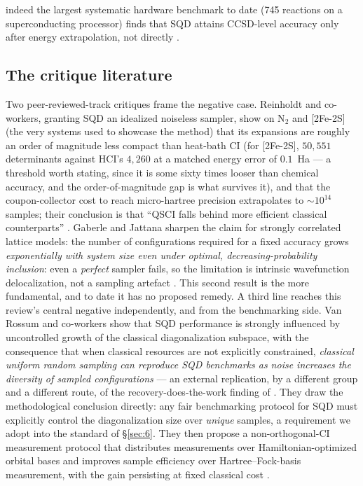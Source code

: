\documentclass[onecolumn,a4paper]{quantumarticle}
\begin{document}
indeed the largest systematic hardware benchmark to date (745 reactions on a superconducting processor) finds that SQD attains CCSD-level accuracy only after energy extrapolation, not directly \cite{raisuddin2025}.


\subsection{The critique literature}\label{sec:5-2}

Two peer-reviewed-track critiques frame the negative case. Reinholdt and co-workers, granting SQD an idealized noiseless sampler, show on N$_2$ and [2Fe-2S] (the very systems used to showcase the method) that its expansions are roughly an order of magnitude less compact than heat-bath CI (for [2Fe-2S], $50{,}551$ determinants against HCI's $4{,}260$ at a matched energy error of $0.1$~Ha --- a threshold worth stating, since it is some sixty times looser than chemical accuracy, and the order-of-magnitude gap is what survives it), and that the coupon-collector cost to reach micro-hartree precision extrapolates to $\sim10^{14}$ samples; their conclusion is that ``QSCI falls behind more efficient classical counterparts'' \cite{reinholdt2025}. Gaberle and Jattana sharpen the claim for strongly correlated lattice models: the number of configurations required for a fixed accuracy grows \emph{exponentially with system size even under optimal, decreasing-probability inclusion}: even a \emph{perfect} sampler fails, so the limitation is intrinsic wavefunction delocalization, not a sampling artefact \cite{gaberle2026}. This second result is the more fundamental, and to date it has no proposed remedy. A third line reaches this review's central negative independently, and from the benchmarking side. Van Rossum and co-workers show that SQD performance is strongly influenced by uncontrolled growth of the classical diagonalization subspace, with the consequence that when classical resources are not explicitly constrained, \emph{classical uniform random sampling can reproduce SQD benchmarks as noise increases the diversity of sampled configurations} --- an external replication, by a different group and a different route, of the recovery-does-the-work finding of \cite{vaquerosabater2026}. They draw the methodological conclusion directly: any fair benchmarking protocol for SQD must explicitly control the diagonalization size over \emph{unique} samples, a requirement we adopt into the standard of \S\ref{sec:6}. They then propose a non-orthogonal-CI measurement protocol that distributes measurements over Hamiltonian-optimized orbital bases and improves sample efficiency over Hartree--Fock-basis measurement, with the gain persisting at fixed classical cost \cite{vanrossum2026}.
\end{document}
